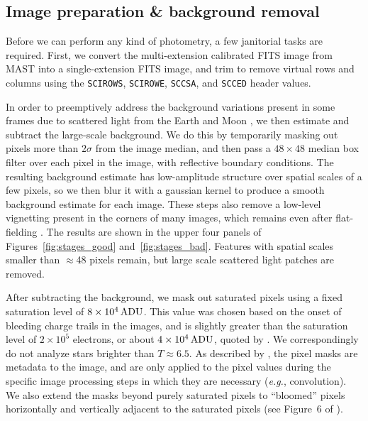\documentclass[12pt,twocolumn,tighten]{aastex62}
\begin{document}
\subsection{Image preparation \& background removal}
\label{subsec:preparation}

Before we can perform any kind of photometry, a few janitorial tasks
are required.
First, we convert the multi-extension calibrated FITS image from MAST
into a single-extension FITS image, and trim to remove virtual rows
and columns using the \texttt{SCIROWS}, \texttt{SCIROWE},
\texttt{SCCSA}, and \texttt{SCCED} header values.

In order to preemptively address the background variations present in
some frames due to scattered light from the Earth and Moon
\citep[see][\S 7.3.1--7.3.4]{vanderspek_2018}, we then estimate and
subtract the large-scale background.  We do this by temporarily
masking out pixels more than $2\sigma$ from the image median, and then
pass a $48\times48$ median box filter over each pixel in the image,
with reflective boundary conditions.  The resulting background
estimate has low-amplitude structure over spatial scales of a few
pixels, so we then blur it with a gaussian kernel to produce a smooth
background estimate for each image.  These steps also remove a
low-level vignetting present in the corners of many images, which
remains even after flat-fielding \citep[see][\S
7.3.5]{vanderspek_2018}.  
The results are shown in the upper four panels of Figures~\ref{fig:stages_good}
and~\ref{fig:stages_bad}.
Features with spatial scales smaller than $\approx$48 pixels remain, 
but large scale scattered light patches are removed.


After subtracting the background, we mask out saturated pixels using a
fixed saturation level of $8\times10^4\,{\rm ADU}$. This value was
chosen based on the onset of bleeding charge trails in the images, and
is slightly greater than the saturation level of $2\times10^5$
electrons, or about $4\times10^4\,{\rm ADU}$, quoted by
\citet{vanderspek_2018}. 
We correspondingly do not analyze stars brighter than $T\approx 6.5$.
As described by \citet{Pal_2009}, the pixel masks are metadata to the
image, and are only applied to the pixel values during the specific
image processing steps in which they are necessary ({\it e.g.},
convolution). We also extend the masks beyond purely saturated pixels
to ``bloomed'' pixels horizontally and vertically adjacent to the
saturated pixels (see Figure~6 of \citealt{Pal_2009}).
\end{document}
